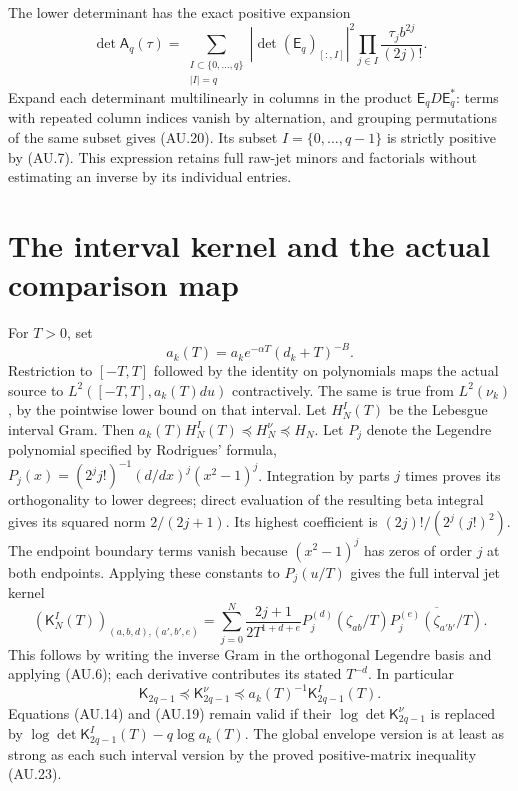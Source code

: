 \documentclass[11pt]{article}
\begin{document}
The lower determinant has the exact positive expansion
\[
 \det\mathsf A_q(\tau)=
 \sum_{\substack{I\subset\{0,\ldots,q\}\\|I|=q}}
 |\det(\mathsf E_q)_{[:,I]}|^2
 \prod_{j\in I}\frac{\tau_jb^{2j}}{(2j)!}.                \tag{AU.20}
\]
Expand each determinant multilinearly in columns in the product
$\mathsf E_qD\mathsf E_q^*$: terms with repeated column indices
vanish by alternation, and grouping permutations of the same subset
gives (AU.20). Its subset $I=\{0,\ldots,q-1\}$ is strictly positive
by (AU.7). This expression retains full raw-jet minors and factorials
without estimating an inverse by its individual entries.

\section{The interval kernel and the actual comparison map}

For $T>0$, set
\[
 a_k(T)=a_ke^{-\alpha T}(d_k+T)^{-B}.
 \tag{AU.21}
\]
Restriction to $[-T,T]$ followed by the identity on polynomials maps
the actual source to $L^2([-T,T],a_k(T)du)$ contractively. The same
is true from $L^2(\nu_k)$, by the pointwise lower bound on that
interval. Let $H_N^I(T)$ be the Lebesgue interval Gram. Then
$a_k(T)H_N^I(T)\preceq H_N^\nu\preceq H_N$.
Let $P_j$ denote the Legendre polynomial specified by Rodrigues'
formula, $P_j(x)=(2^jj!)^{-1}(d/dx)^j(x^2-1)^j$.
Integration by parts $j$ times proves its orthogonality to lower
degrees; direct evaluation of the resulting beta integral gives its
squared norm $2/(2j+1)$. Its highest coefficient is
$(2j)!/(2^j(j!)^2)$. The endpoint boundary terms vanish because
$(x^2-1)^j$ has zeros of order $j$ at both endpoints.
Applying these constants to $P_j(u/T)$ gives the full interval jet
kernel
\[
 (\mathsf K_N^I(T))_{(a,b,d),(a',b',e)}
 =\sum_{j=0}^N\frac{2j+1}{2T^{1+d+e}}
 P_j^{(d)}(\zeta_{ab}/T)
 \overline{P_j^{(e)}(\zeta_{a'b'}/T)}.                    \tag{AU.22}
\]
This follows by writing the inverse Gram in the orthogonal Legendre
basis and applying (AU.6); each derivative contributes its stated
$T^{-d}$. In particular
\[
 \mathsf K_{2q-1}\preceq\mathsf K_{2q-1}^\nu
          \preceq a_k(T)^{-1}\mathsf K_{2q-1}^I(T).       \tag{AU.23}
\]
Equations (AU.14) and (AU.19) remain valid if their
$\log\det\mathsf K_{2q-1}^\nu$ is replaced by
$\log\det\mathsf K_{2q-1}^I(T)-q\log a_k(T)$.
The global envelope version is at least as strong as each such interval
version by the proved positive-matrix inequality (AU.23).
\end{document}
